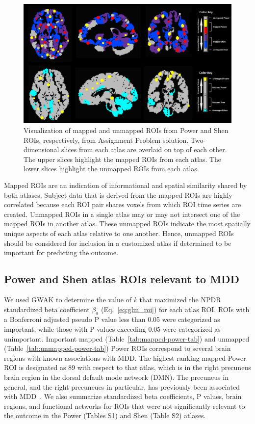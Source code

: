 \documentclass[10pt,letterpaper]{article}\usepackage[]{graphicx}\usepackage[]{color}
\begin{document}
\begin{figure}[h!]
	\centering
	\includegraphics[width=1\textwidth,clip,trim=0cm 0cm 0cm 0.0cm]{mapped-unmapped-montage.png}
	\caption{Visualization of mapped and unmapped ROIs from Power and Shen ROIs, respectively, from Assignment Problem solution. Two-dimensional slices from each atlas are overlaid on top of each other. The upper slices highlight the mapped ROIs from each atlas. The lower slices highlight the unmapped ROIs from each atlas.}\label{fig:power_shen_mapped-unmapped}
\end{figure}

Mapped ROIs are an indication of informational and spatial similarity shared by both atlases. Subject data that is derived from the mapped ROIs are highly correlated because each ROI pair shares voxels from which ROI time series are created. Unmapped ROIs in a single atlas may or may not intersect one of the mapped ROIs in another atlas. These unmapped ROIs indicate the most spatially unique aspects of each atlas relative to one another. Hence, unmapped ROIs should be considered for inclusion in a customized atlas if determined to be important for predicting the outcome.

\subsection{Power and Shen atlas ROIs relevant to MDD}
We used GWAK to determine the value of $k$ that maximized the NPDR standardized beta coefficient $\beta_a$ (Eq.~\ref{eq:glm_roi}) for each atlas ROI. ROIs with a Bonferroni adjusted pseudo P value less than 0.05 were categorized as important, while those with P values exceeding 0.05 were categorized as unimportant. Important mapped (Table~\ref{tab:mapped-power-tab}) and unmapped (Table~\ref{tab:unmapped-power-tab}) Power ROIs correspond to several brain regions with known associations with MDD. The highest ranking mapped Power ROI is designated as 89 with respect to that atlas, which is in the right precuneus brain region in the dorsal default mode network (DMN). The precuneus in general, and the right precuneues in particular, has previously been associated with MDD~\cite{cheng2018,dutta2019,liu2017}. We also summarize standardized beta coefficients, P values, brain regions, and functional networks for ROIs that were not significantly relevant to the outcome in the Power (Tables S1) and Shen (Table S2) atlases.
\end{document}
